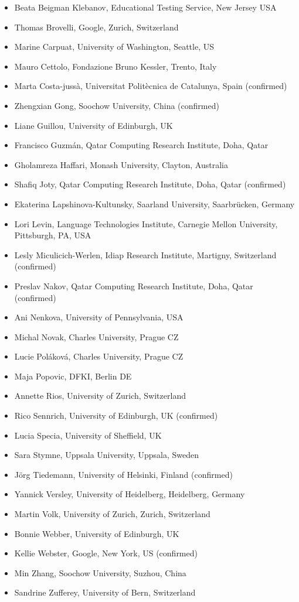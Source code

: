 \documentclass[11pt]{article}
\begin{document}
\begin{itemize}
\item Beata Beigman Klebanov, Educational Testing Service, New Jersey USA
\item Thomas Brovelli, Google, Zurich, Switzerland
\item Marine Carpuat, University of Washington, Seattle, US
\item Mauro Cettolo, Fondazione Bruno Kessler, Trento, Italy
\item Marta Costa-jussà, Universitat Politècnica de Catalunya, Spain (confirmed)
\item Zhengxian Gong, Soochow University, China (confirmed)
\item Liane Guillou, University of Edinburgh, UK
\item Francisco Guzm\'{a}n, Qatar Computing Research Institute, Doha, Qatar
\item Gholamreza Haffari, Monash University, Clayton, Australia
\item Shafiq Joty, Qatar Computing Research Institute, Doha, Qatar (confirmed)
\item Ekaterina Lapshinova-Kultunsky, Saarland University, Saarbrücken, Germany 
\item Lori Levin, Language Technologies Institute, Carnegie Mellon University, Pittsburgh, PA, USA
\item Lesly Miculicich-Werlen, Idiap Research Institute, Martigny, Switzerland (confirmed)
\item Preslav Nakov, Qatar Computing Research Institute, Doha, Qatar (confirmed)
\item Ani Nenkova, University of Pennsylvania, USA
\item Michal Novak, Charles University, Prague CZ
\item Lucie Pol\'{a}kov\'{a}, Charles University, Prague CZ
\item Maja Popovic, DFKI, Berlin DE
\item Annette Rios, University of Zurich, Switzerland
\item Rico Sennrich, University of Edinburgh, UK (confirmed)
\item Lucia Specia, University of Sheffield, UK
\item Sara Stymne, Uppsala University, Uppsala, Sweden
\item Jörg Tiedemann, University of Helsinki, Finland (confirmed)
\item Yannick Versley, University of Heidelberg, Heidelberg, Germany
\item Martin Volk, University of Zurich, Zurich, Switzerland
\item Bonnie Webber, University of Edinburgh, UK
\item Kellie Webster, Google, New York, US (confirmed)
\item Min Zhang, Soochow University, Suzhou, China
\item Sandrine Zufferey, University of Bern, Switzerland
\end{itemize}
\end{document}
